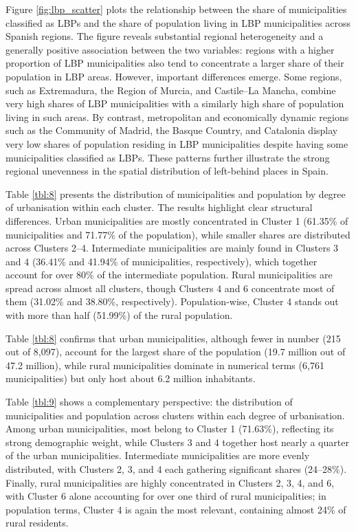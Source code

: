 \documentclass[a4paper,11pt,oneside]{article}
\begin{document}
Figure \ref{fig:lbp_scatter} plots the relationship between the share of municipalities classified as LBPs and the share of population living in LBP municipalities across Spanish regions. The figure reveals substantial regional heterogeneity and a generally positive association between the two variables: regions with a higher proportion of LBP municipalities also tend to concentrate a larger share of their population in LBP areas. However, important differences emerge. Some regions, such as Extremadura, the Region of Murcia, and Castile--La Mancha, combine very high shares of LBP municipalities with a similarly high share of population living in such areas. By contrast, metropolitan and economically dynamic regions such as the Community of Madrid, the Basque Country, and Catalonia display very low shares of population residing in LBP municipalities despite having some municipalities classified as LBPs. These patterns further illustrate the strong regional unevenness in the spatial distribution of left-behind places in Spain.


Table \ref{tbl:8} presents the distribution of municipalities and population by degree of urbanisation within each cluster. The results highlight clear structural differences. Urban municipalities are mostly concentrated in Cluster 1 (61.35\% of municipalities and 71.77\% of the population), while smaller shares are distributed across Clusters 2--4. Intermediate municipalities are mainly found in Clusters 3 and 4 (36.41\% and 41.94\% of municipalities, respectively), which together account for over 80\% of the intermediate population. Rural municipalities are spread across almost all clusters, though Clusters 4 and 6 concentrate most of them (31.02\% and 38.80\%, respectively). Population-wise, Cluster 4 stands out with more than half (51.99\%) of the rural population.



Table \ref{tbl:8} confirms that urban municipalities, although fewer in number (215 out of 8,097), account for the largest share of the population (19.7 million out of 47.2 million), while rural municipalities dominate in numerical terms (6,761 municipalities) but only host about 6.2 million inhabitants.

Table \ref{tbl:9} shows a complementary perspective: the distribution of municipalities and population across clusters within each degree of urbanisation. Among urban municipalities, most belong to Cluster 1 (71.63\%), reflecting its strong demographic weight, while Clusters 3 and 4 together host nearly a quarter of the urban municipalities. Intermediate municipalities are more evenly distributed, with Clusters 2, 3, and 4 each gathering significant shares (24--28\%). Finally, rural municipalities are highly concentrated in Clusters 2, 3, 4, and 6, with Cluster 6 alone accounting for over one third of rural municipalities; in population terms, Cluster 4 is again the most relevant, containing almost 24\% of rural residents.
\end{document}
